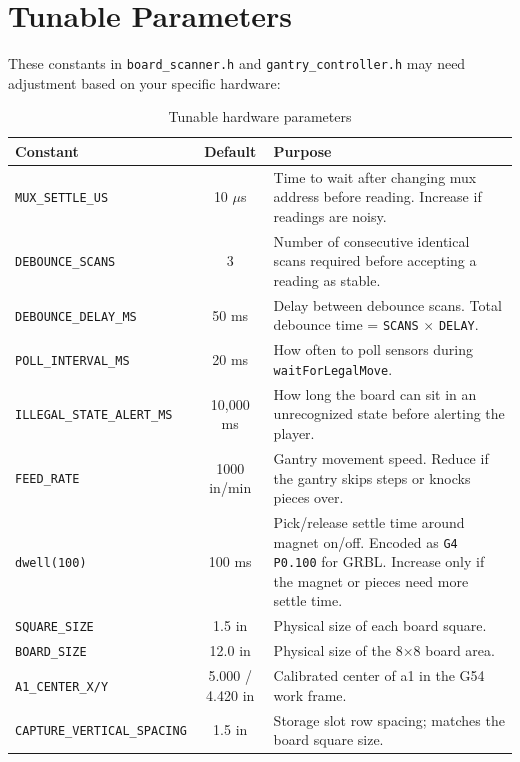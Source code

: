 \documentclass[11pt,a4paper]{report}
\begin{document}
\chapter{Tunable Parameters}

These constants in \texttt{board\_scanner.h} and \texttt{gantry\_controller.h} may need adjustment based on your specific hardware:

\begin{table}[H]
\centering
\begin{tabular}{p{4.5cm}cp{7cm}}
\toprule
\textbf{Constant} & \textbf{Default} & \textbf{Purpose} \\
\midrule
\texttt{MUX\_SETTLE\_US} & 10 $\mu$s & Time to wait after changing mux address before reading. Increase if readings are noisy. \\
\addlinespace
\texttt{DEBOUNCE\_SCANS} & 3 & Number of consecutive identical scans required before accepting a reading as stable. \\
\addlinespace
\texttt{DEBOUNCE\_DELAY\_MS} & 50 ms & Delay between debounce scans. Total debounce time = \texttt{SCANS} $\times$ \texttt{DELAY}. \\
\addlinespace
\texttt{POLL\_INTERVAL\_MS} & 20 ms & How often to poll sensors during \texttt{waitForLegalMove}. \\
\addlinespace
\texttt{ILLEGAL\_STATE\_ALERT\_MS} & 10,000 ms & How long the board can sit in an unrecognized state before alerting the player. \\
\addlinespace
\texttt{FEED\_RATE} & 1000 in/min & Gantry movement speed. Reduce if the gantry skips steps or knocks pieces over. \\
\addlinespace
\texttt{dwell(100)} & 100 ms & Pick/release settle time around magnet on/off. Encoded as \texttt{G4 P0.100} for GRBL. Increase only if the magnet or pieces need more settle time. \\
\addlinespace
\texttt{SQUARE\_SIZE} & 1.5 in & Physical size of each board square. \\
\addlinespace
\texttt{BOARD\_SIZE} & 12.0 in & Physical size of the 8$\times$8 board area. \\
\addlinespace
\texttt{A1\_CENTER\_X/Y} & 5.000 / 4.420 in & Calibrated center of a1 in the G54 work frame. \\
\addlinespace
\texttt{CAPTURE\_VERTICAL\_SPACING} & 1.5 in & Storage slot row spacing; matches the board square size. \\
\bottomrule
\end{tabular}
\caption{Tunable hardware parameters}
\end{table}


\end{document}
